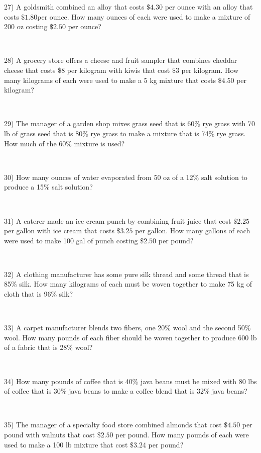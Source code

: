 {27) A goldsmith combined an alloy that costs $\$4.30$ per ounce with
an alloy that costs $\$1.80$per ounce. How many ounces
of each were used to make a mixture of 200 oz costing
$\$2.50$ per ounce?\par
~\par

28) A grocery store offers a cheese and fruit sampler that combines cheddar
cheese that costs $\$8$ per kilogram with kiwis that cost
$\$3$ per kilogram. How many kilograms of each were
used to make a 5 kg mixture that costs $\$4.50$ per kilogram?\par
~\par

29) The manager of a garden shop mixes grass seed that is 60\% rye grass with
70  lb of grass seed that is 80\% rye grass to make a mixture
that is 74\% rye grass. How much of the 60\% mixture
is used?\par
~\par

30) How many ounces of water evaporated from 50 oz of a 12\% salt solution to produce a 15\% salt solution?\par
~\par

31) A caterer made an ice cream punch by combining fruit juice that cost
$\$2.25$ per gallon with ice cream that costs
$\$3.25$ per gallon. How many gallons of each were
used to make 100 gal of punch costing $\$2.50$ per pound?\par
~\par

32) A clothing manufacturer has some pure silk thread and some thread that is 85\% silk. How many kilograms of each must be woven
together to make 75 kg of cloth that is 96\% silk?\par
~\par

33) A carpet manufacturer blends two fibers, one 20\% wool and the second 50\% wool. How many pounds of each fiber should be woven together
to produce 600 lb of a fabric that is 28\% wool?\par
~\par

34) How many pounds of coffee that is 40\% java beans must be mixed with 80 lbs of coffee that is 30\% java beans to make a coffee blend that is
32\% java beans?\par
~\par

35) The manager of a specialty food store combined almonds that cost
$\$4.50$ per pound with walnuts that cost
$\$2.50$ per pound. How many pounds of each were
used to make a 100 lb mixture that cost $\$3.24$ per pound?\par
~\par

}

